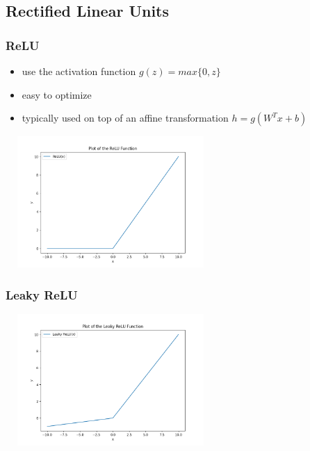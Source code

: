 \documentclass{beamer}
\begin{document}
\subsection{Rectified Linear Units}
\begin{frame}
	\frametitle{ReLU}
	\begin{itemize}
		\item use the activation function $g(z) = max\{0,z\}$
		\item easy to optimize
		\item typically used on top of an aﬃne transformation $h=g(W^Tx + b)$
	\end{itemize}
	\center
	\includegraphics[width=80mm, height =50mm]{ReLU.png}
\end{frame}
\begin{frame}
	\frametitle{Leaky ReLU}
\center
	\includegraphics[width=80mm, height =50mm]{leaky_ReLU.png}
	
\end{frame}
\end{document}
